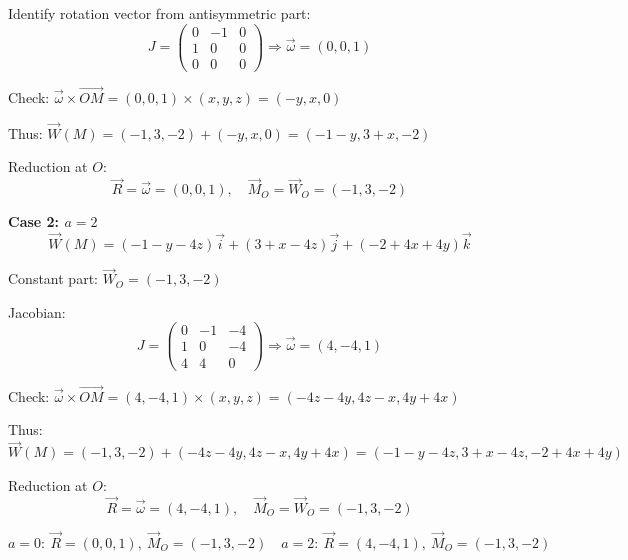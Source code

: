 \documentclass[12pt]{article}
\begin{document}
\begin{correctionbox}
Identify rotation vector from antisymmetric part:
\[
J = \begin{pmatrix}
0 & -1 & 0 \\
1 & 0 & 0 \\
0 & 0 & 0
\end{pmatrix}
\Rightarrow \vec{\omega} = (0, 0, 1)
\]

Check: $\vec{\omega} \times \vec{OM} = (0,0,1) \times (x,y,z) = (-y, x, 0)$

Thus: $\vec{W}(M) = (-1, 3, -2) + (-y, x, 0) = (-1-y, 3+x, -2)$

Reduction at $O$:
\[
\vec{R} = \vec{\omega} = (0, 0, 1), \quad \vec{M}_O = \vec{W}_O = (-1, 3, -2)
\]

\textbf{Case 2: $a = 2$}
\[
\vec{W}(M) = (-1 - y - 4z)\vec{i} + (3 + x - 4z)\vec{j} + (-2 + 4x + 4y)\vec{k}
\]

Constant part: $\vec{W}_O = (-1, 3, -2)$

Jacobian:
\[
J = \begin{pmatrix}
0 & -1 & -4 \\
1 & 0 & -4 \\
4 & 4 & 0
\end{pmatrix}
\Rightarrow \vec{\omega} = (4, -4, 1)
\]

Check: $\vec{\omega} \times \vec{OM} = (4,-4,1) \times (x,y,z) = (-4z -4y, 4z - x, 4y + 4x)$

Thus: $\vec{W}(M) = (-1, 3, -2) + (-4z-4y, 4z-x, 4y+4x) = (-1-y-4z, 3+x-4z, -2+4x+4y)$ 

Reduction at $O$:
\[
\vec{R} = \vec{\omega} = (4, -4, 1), \quad \vec{M}_O = \vec{W}_O = (-1, 3, -2)
\]

\[
\boxed{a=0: \ \vec{R}=(0,0,1), \ \vec{M}_O=(-1,3,-2) \quad a=2: \ \vec{R}=(4,-4,1), \ \vec{M}_O=(-1,3,-2)}
\]
\end{correctionbox}
\end{document}
